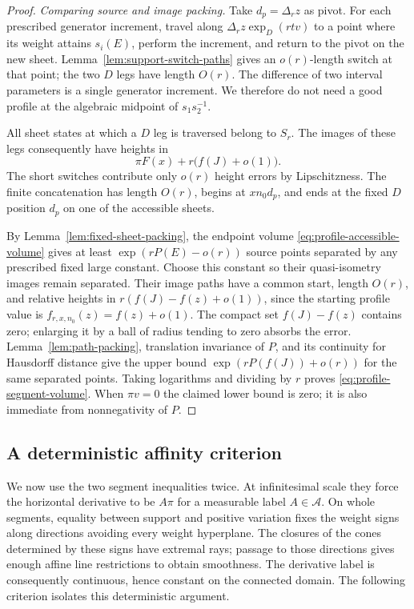 \begin{proof}
\emph{Comparing source and image packing.}
Take $d_p=\Delta_r z$ as pivot.  For each prescribed generator increment,
travel along $\Delta_r z\exp_D(rt v)$ to a point where its weight
attains $s_i(E)$, perform the increment, and return to the pivot on
the new sheet.  Lemma~\ref{lem:support-switch-paths} gives an
$o(r)$-length switch at that point; the two $D$ legs have length
$O(r)$.  The difference of two interval parameters is a single
generator increment.  We therefore do not need a good profile at
the algebraic midpoint of $s_1s_2^{-1}$.

All sheet states at which a $D$ leg is traversed belong to $S_r$.
The images of these legs consequently have heights in
\[
 \pi F(x)+r\bigl(f(J)+o(1)\bigr).
\]
The short switches contribute only $o(r)$ height errors by
Lipschitzness.  The finite concatenation has length $O(r)$, begins
at $xn_0d_p$, and ends at the fixed $D$ position $d_p$ on one of the
accessible sheets.

By Lemma~\ref{lem:fixed-sheet-packing}, the endpoint volume
\eqref{eq:profile-accessible-volume} gives at least
$\exp(rP(E)-o(r))$ source points separated by any prescribed fixed
large constant.  Choose this constant so their quasi-isometry
images remain separated.  Their image paths have a common start,
length $O(r)$, and relative heights in
$r(f(J)-f(z)+o(1))$, since the starting profile value is
$f_{r,x,n_0}(z)=f(z)+o(1)$.  The compact set $f(J)-f(z)$ contains
zero; enlarging it by a ball of radius tending to zero absorbs the
error.  Lemma~\ref{lem:path-packing}, translation invariance
of $P$, and its continuity for Hausdorff distance give the upper
bound $\exp(rP(f(J))+o(r))$ for the same separated points.
Taking logarithms and dividing by $r$ proves
\eqref{eq:profile-segment-volume}.  When $\pi v=0$ the claimed lower
bound is zero; it is also immediate from nonnegativity of $P$.
\end{proof}

\subsection{A deterministic affinity criterion}

We now use the two segment inequalities twice.  At infinitesimal
scale they force the horizontal derivative to be $A\pi$ for a
measurable label $A\in\mathcal A$.  On whole segments, equality
between support and positive variation fixes the weight signs along
directions avoiding every weight hyperplane.  The closures of the cones
determined by these signs have extremal rays; passage to those directions
gives enough affine line restrictions to obtain smoothness.  The derivative label
is consequently continuous, hence constant on the connected domain.
The following criterion isolates this deterministic argument.


